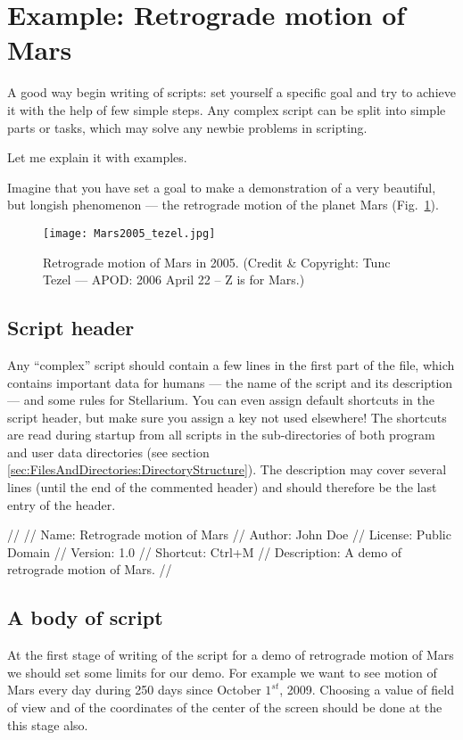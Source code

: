 \section{Example: Retrograde motion of Mars}
\label{sec:scripting:RetrogradeMotionOfMars}
A good way begin writing of scripts: set yourself a specific
goal and try to achieve it with the help of few simple steps. Any
complex script can be split into simple parts or tasks, which may solve any
newbie problems in scripting.

Let me explain it with examples.

Imagine that you have set a goal to make a demonstration of a  very
beautiful, but longish phenomenon --- the retrograde motion of the
planet Mars (Fig.~\ref{fig:Mars2005}).

\begin{figure}[tb]
\centering\texttt{[image: Mars2005\_tezel.jpg]}
\caption{Retrograde motion of Mars in 2005. {\small(Credit \& Copyright: Tunc Tezel --- APOD: 2006 April 22 -- Z is for Mars.)}}
\label{fig:Mars2005}
\end{figure}

\subsection{Script header}
Any ``complex'' script should contain a few lines in the first part of
the file, which contains important data for humans --- the name of the
script and its description --- and some rules for Stellarium. You can
even assign default shortcuts in the script header, but make sure you
assign a key not used elsewhere! The shortcuts are read during startup
from all scripts in the  sub-directories of both program
and user data directories (see section
\ref{sec:FilesAndDirectories:DirectoryStructure}).  The description
may cover several lines (until the end of the commented header) and
should therefore be the last entry of the header.

\begin{script}
//
// Name: Retrograde motion of Mars
// Author: John Doe
// License: Public Domain
// Version: 1.0
// Shortcut: Ctrl+M
// Description: A demo of retrograde motion of Mars.
//
\end{script}

\subsection{A body of script}
At the first stage of writing of the script for a demo of 
retrograde motion of Mars we should set some limits for 
our demo. For example we want to see motion of Mars every 
day during 250 days since October $1^{st}$,  2009. 
Choosing a value of field of view and of the coordinates 
of the center of the screen should be done at the this 
stage also. 

